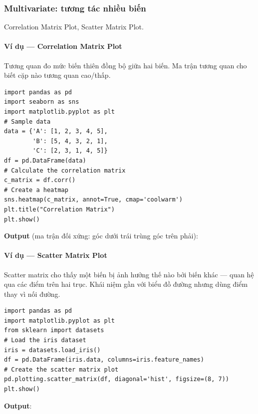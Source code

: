 \subsubsection{Multivariate: tương tác nhiều biến}

\begin{phuongphap}[title={Hai kỹ thuật multivariate}]
Correlation Matrix Plot, Scatter Matrix Plot.
\end{phuongphap}

\paragraph{Ví dụ --- Correlation Matrix Plot}

\begin{ynghia}[title={Ma trận tương quan}]
Tương quan đo mức biến thiên đồng bộ giữa hai biến.
Ma trận tương quan cho biết cặp nào tương quan cao/thấp.
\end{ynghia}

\begin{vidu}[title={Code heatmap tương quan}]
\begin{lstlisting}
import pandas as pd
import seaborn as sns
import matplotlib.pyplot as plt
# Sample data
data = {'A': [1, 2, 3, 4, 5],
        'B': [5, 4, 3, 2, 1],
        'C': [2, 3, 1, 4, 5]}
df = pd.DataFrame(data)
# Calculate the correlation matrix
c_matrix = df.corr()
# Create a heatmap
sns.heatmap(c_matrix, annot=True, cmap='coolwarm')
plt.title("Correlation Matrix")
plt.show()
\end{lstlisting}
\textbf{Output} (ma trận đối xứng: góc dưới trái trùng góc trên phải):
\end{vidu}

\paragraph{Ví dụ --- Scatter Matrix Plot}

\begin{ynghia}[title={Scatter matrix}]
Scatter matrix cho thấy một biến bị ảnh hưởng thế nào bởi biến khác --- quan hệ qua các điểm trên hai trục.
Khái niệm gần với biểu đồ đường nhưng dùng điểm thay vì nối đường.
\end{ynghia}

\begin{vidu}[title={Code scatter matrix (Pandas + sklearn Iris)}]
\begin{lstlisting}
import pandas as pd
import matplotlib.pyplot as plt
from sklearn import datasets
# Load the iris dataset
iris = datasets.load_iris()
df = pd.DataFrame(iris.data, columns=iris.feature_names)
# Create the scatter matrix plot
pd.plotting.scatter_matrix(df, diagonal='hist', figsize=(8, 7))
plt.show()
\end{lstlisting}
\textbf{Output}:
\end{vidu}

